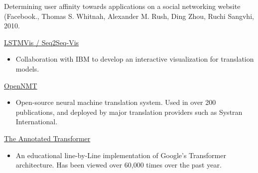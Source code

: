 \documentclass[10pt]{article}
\begin{document}
\ind  Determining user affinity towards applications on a social networking website (Facebook., Thomas S. Whitnah, Alexander M. Rush, Ding Zhou, Ruchi Sangvhi, 2010.



\bigskip


\bigskip


\medskip \ind \href{ http://seq2seq-vis.io/ }{ LSTMVis / Seq2Seq-Vis }
\begin{itemize}
\item Collaboration with IBM to develop an interactive visualization for translation models.
\end{itemize}



\medskip \ind \href{ http://opennmt.net }{ OpenNMT }
\begin{itemize}
\item  Open-source neural machine translation system. Used in over 200 publications, and
  deployed by major translation providers such as Systran International.
\end{itemize}



\medskip \ind \href{ http://nlp.seas.harvard.edu/2018/04/03/attention.html }{ The Annotated Transformer }
\begin{itemize}
\item  An educational line-by-Line implementation of Google's Transformer architecture.
  Has been viewed over 60,000 times over the past year.
\end{itemize}


% 
% 
% 

% 
% 

% 
% 
\end{document}
